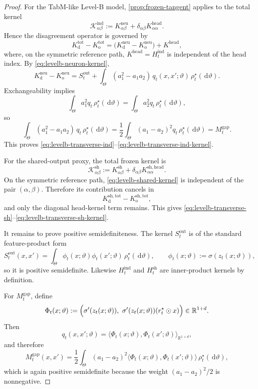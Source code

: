 \documentclass[11pt]{article}
\theoremstyle{definition}
\newcommand{\R}{\mathbb{R}}
\newcommand{\dd}{\,\mathrm{d}}
\begin{document}
\begin{proof}
For the TabM-like Level-B model, \cref{prop:frozen-tangent} applies to the total kernel
\[
  \mathcal K_{\alpha\beta}^{\mathrm{ind}}
  :=
  K_{\alpha\beta}^{\mathrm{neu}}
  +
  \delta_{\alpha\beta}K^{\mathrm{head}}_{\alpha\alpha}.
\]
Hence the disagreement operator is governed by
\[
  K_{\mathrm d}^{\mathrm{tot}}-K_{\mathrm o}^{\mathrm{tot}}
  =
  \bigl(K_{\mathrm d}^{\mathrm{neu}}-K_{\mathrm o}^{\mathrm{neu}}\bigr)
  +
  K^{\mathrm{head}},
\]
where, on the symmetric reference path, $K^{\mathrm{head}}=H_t^{\mathrm{ind}}$ is independent of the head index.
By \cref{eq:levelb-neuron-kernel},
\[
  K_{\mathrm d}^{\mathrm{neu}}-K_{\mathrm o}^{\mathrm{neu}}
  =
  S_t^{\mathrm{out}}
  +
  \int_\Theta
  (a_1^2-a_1a_2)\,q_t(x,x';\vartheta)\,\rho_t^\star(\dd \vartheta).
\]
Exchangeability implies
\[
  \int_\Theta a_1^2 q_t\,\rho_t^\star(\dd \vartheta)
  =
  \int_\Theta a_2^2 q_t\,\rho_t^\star(\dd \vartheta),
\]
so
\[
  \int_\Theta
  (a_1^2-a_1a_2)\,q_t\,\rho_t^\star(\dd \vartheta)
  =
  \frac12
  \int_\Theta
  (a_1-a_2)^2 q_t\,\rho_t^\star(\dd \vartheta)
  =
  M_t^{\mathrm{gap}}.
\]
This proves \eqref{eq:levelb-transverse-ind}--\eqref{eq:levelb-transverse-ind-kernel}.

For the shared-output proxy, the total frozen kernel is
\[
  \mathcal K_{\alpha\beta}^{\mathrm{sh}}
  :=
  K_{\alpha\beta}^{\mathrm{sh}}
  +
  \delta_{\alpha\beta}K_{\alpha\alpha}^{\mathrm{sh,head}}.
\]
On the symmetric reference path, \cref{eq:levelb-shared-kernel} is independent of the pair $(\alpha,\beta)$.
Therefore its contribution cancels in
\[
  K_{\mathrm d}^{\mathrm{sh,tot}}-K_{\mathrm o}^{\mathrm{sh,tot}},
\]
and only the diagonal head-kernel term remains.
This gives \eqref{eq:levelb-transverse-sh}--\eqref{eq:levelb-transverse-sh-kernel}.

It remains to prove positive semidefiniteness.
The kernel $S_t^{\mathrm{out}}$ is of the standard feature-product form
\[
  S_t^{\mathrm{out}}(x,x')
  =
  \int_\Theta
  \phi_t(x;\vartheta)\phi_t(x';\vartheta)\,\rho_t^\star(\dd \vartheta),
  \qquad
  \phi_t(x;\vartheta):=\sigma(z_t(x;\vartheta)),
\]
so it is positive semidefinite.
Likewise $H_t^{\mathrm{ind}}$ and $H_t^{\mathrm{sh}}$ are inner-product kernels by definition.

For $M_t^{\mathrm{gap}}$, define
\[
  \Phi_t(x;\vartheta)
  :=
  \Bigl(
    \sigma'(z_t(x;\vartheta)),
    \ \sigma'(z_t(x;\vartheta))(r_t^\star\odot x)
  \Bigr)\in \R^{1+d}.
\]
Then
\[
  q_t(x,x';\vartheta)=\langle \Phi_t(x;\vartheta),\Phi_t(x';\vartheta)\rangle_{\R^{1+d}},
\]
and therefore
\[
  M_t^{\mathrm{gap}}(x,x')
  =
  \frac12
  \int_\Theta
  (a_1-a_2)^2
  \langle \Phi_t(x;\vartheta),\Phi_t(x';\vartheta)\rangle
  \,\rho_t^\star(\dd \vartheta),
\]
which is again positive semidefinite because the weight $(a_1-a_2)^2/2$ is nonnegative.
\end{proof}
\end{document}
